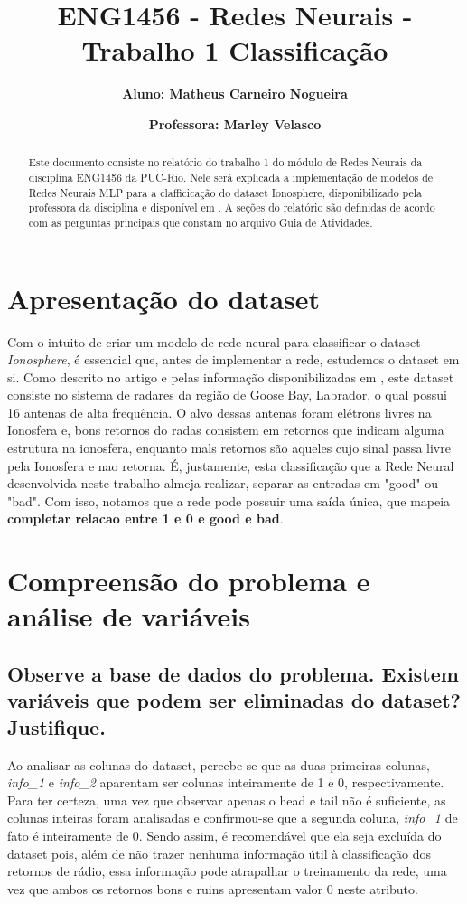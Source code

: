 \documentclass[12pt]{article}
\title{\textbf{ENG1456 - Redes Neurais - Trabalho 1 Classificação}}
\author{\textbf{Aluno: Matheus Carneiro Nogueira}}
\affil{}
\author{\textbf{Professora: Marley Velasco}}
\affil{}
\date{}
\begin{document}
	\maketitle
	\tableofcontents
	
\begin{abstract}
	Este documento consiste no relatório do trabalho 1 do módulo de Redes Neurais da disciplina ENG1456 da PUC-Rio. Nele será explicada a implementação de modelos de Redes Neurais MLP para a clafficicação do dataset Ionosphere, disponibilizado pela professora da disciplina e disponível em \cite{Dataset}. A seções do relatório são definidas de acordo com as perguntas principais que constam no arquivo Guia de Atividades.
\end{abstract}

\section{Apresentação do dataset}

Com o intuito de criar um modelo de rede neural para classificar o dataset \textit{Ionosphere}, é essencial que, antes de implementar a rede, estudemos o dataset em si. Como descrito no artigo \cite{Paper1989} e pelas informação disponibilizadas em \cite{Dataset}, este dataset consiste no sistema de radares da região de Goose Bay, Labrador, o qual possui 16 antenas de alta frequência. O alvo dessas antenas foram elétrons livres na Ionosfera e, bons retornos do radas consistem em retornos que indicam alguma estrutura na ionosfera, enquanto mals retornos são aqueles cujo sinal passa livre pela Ionosfera e nao retorna. É, justamente, esta classificação que a Rede Neural desenvolvida neste trabalho almeja realizar, separar as entradas em "good" ou "bad". Com isso, notamos que a rede pode possuir uma saída única, que mapeia \textbf{completar relacao entre 1 e 0 e good e bad}.

\section{Compreensão do problema e análise de variáveis}

\subsection{Observe a base de dados do problema. Existem variáveis que podem ser	eliminadas do dataset? Justifique.}

Ao analisar as colunas do dataset, percebe-se que as duas primeiras colunas, \textit{info\_1} e \textit{info\_2} aparentam ser colunas inteiramente de 1 e 0, respectivamente. Para ter certeza, uma vez que observar apenas o head e tail não é suficiente, as colunas inteiras foram analisadas e confirmou-se que a segunda coluna, \textit{info\_1} de fato é inteiramente de 0. Sendo assim, é recomendável que ela seja excluída do dataset pois, além de não trazer nenhuma informação útil à classificação dos retornos de rádio, essa informação pode atrapalhar o treinamento da rede, uma vez que ambos os retornos bons e ruins apresentam valor 0 neste atributo.
\end{document}

